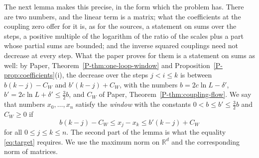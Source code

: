 \documentclass[11pt]{preprint}
\numberwithin{equation}{section}
\theoremstyle{definition}
\theoremstyle{remark}
\theoremstyle{plain}
\begin{document}
The next lemma makes this precise, in the form which the problem has. There are two numbers, and the linear term is a matrix; what the coefficients at the coupling zero offer for it is, as for the sources, a statement on sums over the steps, a positive multiple of the logarithm of the ratio of the scales plus a part whose partial sums are bounded; and the inverse squared couplings need not decrease at every step. What the paper proves for them is a statement on sums as well: by Paper, Theorem~\ref{P-thm:one-loop-window} and Proposition~\ref{P-prop:coefficients}(i), the decrease over the steps $j < i \leq k$ is between $b(k - j) - C_W$ and $b'(k - j) + C_W$, with the numbers $b = 2c\ln L - \delta'$, $b' = 2c\ln L + \delta' \leq \frac32b$, and $C_W$ of Paper, Theorem~\ref{P-thm:coupling-flow}. We say that numbers $x_0, \dots, x_n$ satisfy the \emph{window} with the constants $0 < b \leq b' \leq \frac32b$ and $C_W \geq 0$ if
\begin{equation}\label{eq:window-hypothesis}
    b(k - j) - C_W \leq x_j - x_k \leq b'(k - j) + C_W
\end{equation}
for all $0 \leq j \leq k \leq n$. The second part of the lemma is what the equality \eqref{eq:target} requires. We use the maximum norm on $\mathbb R^d$ and the corresponding norm of matrices.
\end{document}
